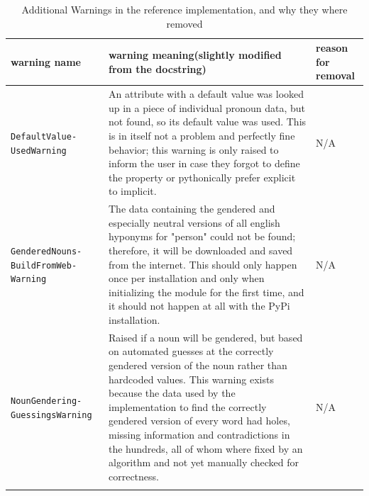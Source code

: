 \documentclass{article}
\newcounter{subsubsubsection}[subsubsection]
\begin{document}
    \begin{flushleft}
        \begin{center}
            \begin{longtable}{|>{\raggedright\arraybackslash}p{8em} | >{\raggedright\arraybackslash}p{14em} | >{\raggedright\arraybackslash}p{14em} |}
                 \hline
                 warning name & warning meaning\linebreak (slightly modified from the docstring) & reason for removal\\
                 \hline\hline
                 \texttt{DefaultValue- UsedWarning} & An attribute with a default value was looked up in a piece of individual pronoun data, but not found, so its default value was used.
                 This is in itself not a problem and perfectly fine behavior;
                 this warning is only raised to inform the user in case they forgot to define the property or pythonically prefer explicit to implicit.
                 & N/A\\
                 \hline
                 \texttt{GenderedNouns- BuildFromWeb- Warning} & The data containing the gendered and especially neutral versions of all english hyponyms for "person" could not be found;
                 therefore, it will be downloaded and saved from the internet.
                 This should only happen once per installation and only when initializing the module for the first time, and it should not happen at all with the  PyPi installation.
                 & N/A\\
                 \hline
                \texttt{NounGendering- GuessingsWarning} & Raised if a noun will be gendered, but based on automated guesses at the correctly gendered version of the noun rather than hardcoded values.
                 This warning exists because the data used by the implementation to find the correctly gendered version of every word had holes, missing information and contradictions in the hundreds, all of whom where fixed by an algorithm and not yet manually checked for correctness.
                 & N/A\\
                 \hline
                \caption{Additional Warnings in the reference implementation, and why they where removed}
            \end{longtable}
        \end{center}
    \end{flushleft}

\end{document}
